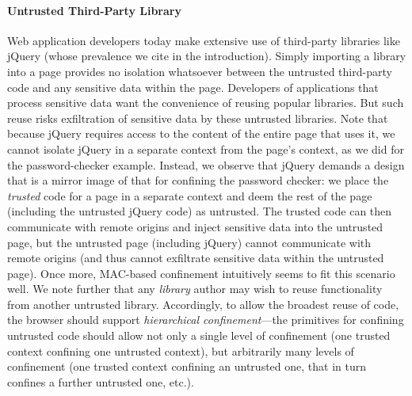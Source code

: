\paragraph{Untrusted Third-Party Library}
Web application developers today make extensive use of third-party
libraries like jQuery (whose prevalence we cite in the
introduction). Simply importing a library into a page provides no
isolation whatsoever between the untrusted third-party code and any
sensitive data within the page. Developers of applications that
process sensitive data want the convenience of reusing popular
libraries. But such reuse risks exfiltration of sensitive data by
these untrusted libraries. Note that because jQuery requires access to
the content of the entire page that uses it, we cannot isolate jQuery
in a separate context from the page's context, as we did for the
password-checker example. Instead, we observe that jQuery demands a
design that is a mirror image of that for confining the password
checker: we place the {\em trusted} code for a page in a separate
context and deem the rest of the page (including the untrusted jQuery
code) as untrusted. The trusted code can then communicate with remote
origins and inject sensitive data into the untrusted page, but the
untrusted page (including jQuery) cannot communicate with remote
origins (and thus cannot exfiltrate sensitive data within the
untrusted page). Once more, MAC-based confinement intuitively seems to
fit this scenario well. We note further that any {\em library} author
may wish to reuse functionality from another untrusted
library. Accordingly, to allow the broadest reuse of code, the browser
should support {\em hierarchical confinement}---the primitives for
confining untrusted code should allow not only a single level of
confinement (one trusted context confining one untrusted context), but
arbitrarily many levels of confinement (one trusted context confining
an untrusted one, that in turn confines a further untrusted one,
etc.).



